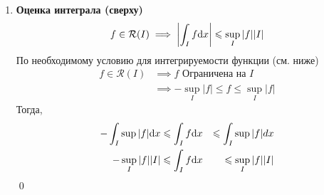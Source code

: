 \documentclass[a4paper]{article}
\begin{document}
\begin{enumerate}
{    Отсюда
    \begin{equation*}
    \begin{aligned}
        A_f - \ve < \sigma_f \leqslant \sigma_g < A_g + \ve \implies
        A_f - \epsilon < A_g + \epsilon \implies A_f < A_g + 2 \epsilon \qquad \forall \epsilon > 0
    \end{aligned}
    \end{equation*}
\qed
}
\item {\textbf{Оценка интеграла (сверху)}
\begin{equation*}
    f\in \mathcal{R}(I) \implies \left|\int_If\text{d}x\right| \leqslant\sup\limits_{I}|f||I|
\end{equation*}
\proof
По необходимому условию для интегрируемости функции (см. ниже)
\begin{equation*}
    \begin{aligned}
        f\in \mathcal{R}(I) &\implies f \text{ Ограничена на } I\\
        &\implies -\sup_I|f| \leqslant f \leqslant \sup_I|f|
    \end{aligned}
\end{equation*}
Тогда,
\begin{equation*}
    \begin{aligned}
        -\int_I\sup|f|\text{d}x &\leqslant \int_If\text{d}x &\leqslant\int_I\sup|f|dx\\
        -\sup_I|f||I|&\leqslant \int_If\text{d}x&\leqslant \sup_I|f||I|
    \end{aligned}
\end{equation*}
\qed
}
\end{enumerate}
\end{document}
